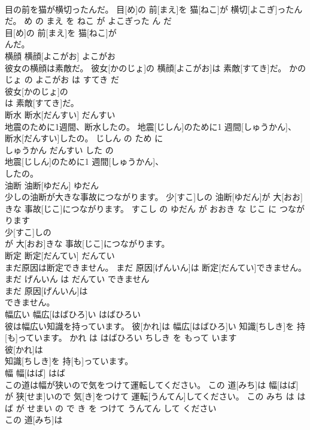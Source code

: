 \documentclass[8pt]{extreport}
\begin{document}
\begin{CJK}{UTF8}{min}
\\	目の前を猫が横切ったんだ。	目[め]の 前[まえ]を 猫[ねこ]が 横切[よこぎ]ったんだ。	め の まえ を ねこ が よこぎった ん だ	
\\	目[め]の 前[まえ]を 猫[ねこ]が
\\	んだ。			
\\	横顔	横顔[よこがお]	よこがお	
\\	彼女の横顔は素敵だ。	彼女[かのじょ]の 横顔[よこがお]は 素敵[すてき]だ。	かのじょ の よこがお は すてき だ	
\\	彼女[かのじょ]の
\\	は 素敵[すてき]だ。			
\\	断水	断水[だんすい]	だんすい	
\\	地震のために1週間、断水したの。	地震[じしん]のために1 週間[しゅうかん]、 断水[だんすい]したの。	じしん の ため に 
\\	しゅうかん だんすい した の	
\\	地震[じしん]のために1 週間[しゅうかん]、
\\	したの。			
\\	油断	油断[ゆだん]	ゆだん	
\\	少しの油断が大きな事故につながります。	少[すこ]しの 油断[ゆだん]が 大[おお]きな 事故[じこ]につながります。	すこし の ゆだん が おおき な じこ に つながります	
\\	少[すこ]しの
\\	が 大[おお]きな 事故[じこ]につながります。			
\\	断定	断定[だんてい]	だんてい	
\\	まだ原因は断定できません。	まだ 原因[げんいん]は 断定[だんてい]できません。	まだ げんいん は だんてい できません	
\\	まだ 原因[げんいん]は
\\	できません。			
\\	幅広い	幅広[はばひろ]い	はばひろい	
\\	彼は幅広い知識を持っています。	彼[かれ]は 幅広[はばひろ]い 知識[ちしき]を 持[も]っています。	かれ は はばひろい ちしき を もって います	
\\	彼[かれ]は
\\	知識[ちしき]を 持[も]っています。			
\\	幅	幅[はば]	はば	
\\	この道は幅が狭いので気をつけて運転してください。	この 道[みち]は 幅[はば]が 狭[せま]いので 気[き]をつけて 運転[うんてん]してください。	この みち は はば が せまい の で き を つけて うんてん して ください	
\\	この 道[みち]は

\end{CJK}
\end{document}
